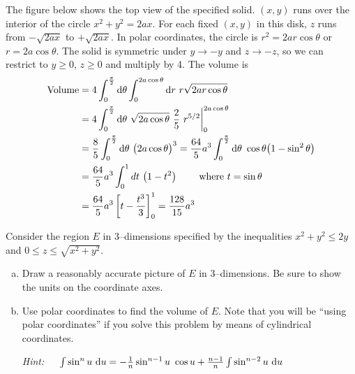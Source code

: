 \begin{solution}
The figure below shows the top view of the specified solid.
$(x,y)$ runs over the interior of the circle $x^2+y^2=2ax$. For each fixed
$(x,y)$ in this disk, $z$ runs from $-\sqrt{2ax}$ to $+\sqrt{2ax}$. In polar
coordinates, the circle is $r^2=2ar\cos\theta$ or $r=2a\cos\theta$. 
%
The solid
is symmetric under $y\rightarrow -y$ and $z\rightarrow -z$, so we can restrict
to $y\ge 0$, $z\ge 0$ and multiply by 4. The volume is
\begin{align*}
\text{Volume}
&=4\int_0^{\pi\over 2} \dee{\theta}\int_0^{2a\cos\theta} \dee{r}\  
                                                r\sqrt{2ar\cos\theta}
\\
&=4\int_0^{\pi\over 2} \dee{\theta}\ \sqrt{2a\cos\theta}\ \frac{2}{5}\ 
                                 r^{5/2}\bigg|_0^{2a\cos\theta}
\\
&=\frac{8}{5}\int_0^{\pi\over 2} \dee{\theta}\ \big(2a\cos\theta\big)^3
=\frac{64}{5}a^3\int_0^{\pi\over 2} \dee{\theta}\ \cos\theta\big(1-\sin^2\theta\big)\cr
&=\frac{64}{5}a^3\int_0^1 dt\ \big(1-t^2\big)
\qquad\text{ where $t=\sin\theta$}\cr
&=\frac{64}{5}a^3\left[t-\frac{t^3}{3}\right]_0^1
=\frac{128}{15}a^3
\end{align*}
\end{solution}


\begin{question}[M200 2005D] %
Consider  the region $E$ in 3--dimensions specified by the inequalities 
$x^2 + y^2 \le 2y$ and $0 \le z \le \sqrt{x^2 + y^2}$.
\begin{enumerate}[(a)]
\item
  Draw a reasonably accurate picture of $E$ in 3--dimensions. 
Be sure to show the units on the coordinate axes.
\item 
  Use polar coordinates to find the volume of $E$. Note that you will 
  be ``using polar coordinates'' if you solve this problem
 by means of cylindrical coordinates. 

 \emph{Hint:}\ \ \ 
    $\int \sin^n u\ \mathrm{d}u =-\frac{1}{n}\sin^{n-1}u\ \cos u
                 +\frac{n-1}{n}\int\sin^{n-2}u\ \mathrm{d}u$
\end{enumerate}
\end{question}

